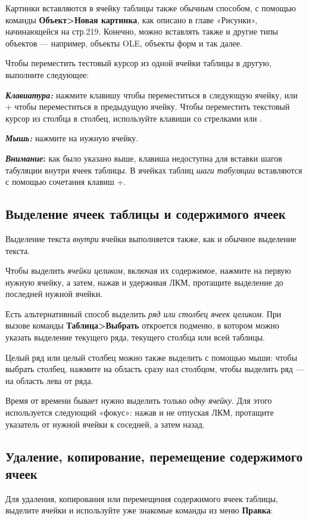 \documentclass[a4paper,10pt]{article}
\begin{document}
Картинки вставляются в ячейку таблицы также обычным способом, с помощью команды \textbf{Объект>Новая картинка}, как описано в главе «Рисунки», начинающейся на стр.219. Конечно, можно вставлять также и другие типы объектов --- например, объекты OLE, объекты форм и так далее.

Чтобы переместить тестовый курсор из одной ячейки таблицы в другую, выполните следующее:

\textbf{\textit{Клавиатура:}} нажмите клавишу  чтобы переместиться в следующую ячейку, или + чтобы переместиться в предыдущую ячейку. Чтобы переместить текстовый курсор из столбца в столбец, используйте клавиши со стрелками \keys{\arrowkeyup} или \keys{\arrowkeydown}.

\textbf{\textit{Мышь:}} нажмите на нужную ячейку.

\begin{mdframed}[backgroundcolor=blue!10]
\textbf{\textit{Внимание}:} как было указано выше, клавиша  недоступна для вставки шагов табуляции внутри ячеек таблицы. В ячейках таблиц \textit{шаги табуляции} вставляются с помощью сочетания клавиш +.
\end{mdframed}

\subsection{Выделение ячеек таблицы и содержимого ячеек}
Выделение текста \textit{внутри} ячейки выполняется также, как и обычное выделение текста.

Чтобы выделить \textit{ячейки целиком}, включая их содержимое, нажмите на первую нужную ячейку, а затем, нажав и удерживая ЛКМ, протащите выделение до последней нужной ячейки.

Есть альтернативный способ выделить \textit{ряд или столбец ячеек целиком}. При вызове команды \textbf{Таблица>Выбрать} откроется подменю, в котором можно указать выделение текущего ряда, текущего столбца или всей таблицы.

Целый ряд или целый столбец можно также выделить с помощью мыши: чтобы выбрать столбец, нажмите на область сразу нал столбцом, чтобы выделить ряд --- на область лева от ряда.

Время от времени бывает нужно выделить только \textit{одну ячейку}. Для этого используется следующий «фокус»: нажав и не отпуская ЛКМ, протащите указатель от нужной ячейки к соседней, а затем назад.

\subsection{Удаление, копирование, перемещение содержимого ячеек}
Для удаления, копирования или перемещения содержимого ячеек таблицы, выделите ячейки и используйте уже знакомые команды из меню \textbf{Правка}:
\end{document}
